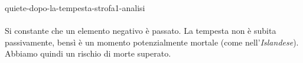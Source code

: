 \documentclass[preview]{standalone}
\begin{document}
\begin{snippet}{quiete-dopo-la-tempesta-strofa1-analisi}
    \\\\
    Si constante che un elemento negativo è passato.
    La tempesta non è subita passivamente, bensì è un momento potenzialmente mortale
    (come nell'\textit{Islandese}). Abbiamo quindi un rischio di morte superato.
    \\\\
    \\


\end{snippet}
\end{document}

